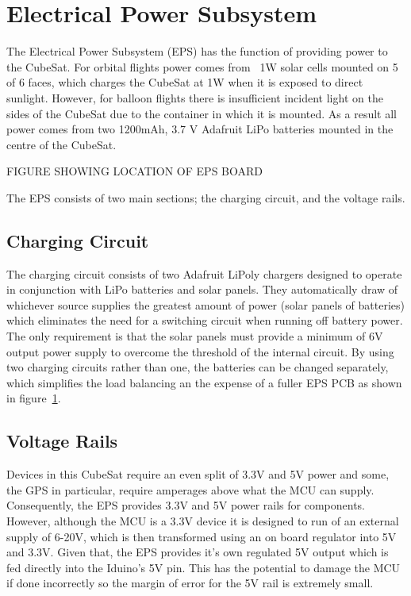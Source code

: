 \section{Electrical Power Subsystem}

The Electrical Power Subsystem (EPS) has the function of providing power to the CubeSat.  For orbital flights power comes from ~1W solar cells mounted on 5 of 6 faces, which charges the CubeSat at 1W when it is exposed to direct sunlight.  However, for balloon flights there is insufficient incident light on the sides of the CubeSat due to the container in which it is mounted.  As a result all power comes from two 1200mAh, 3.7 V Adafruit LiPo batteries mounted in the centre of the CubeSat.

FIGURE SHOWING LOCATION OF EPS BOARD

The EPS consists of two main sections; the charging circuit, and the voltage rails. 

\subsection{Charging Circuit}
The charging circuit consists of two Adafruit LiPoly chargers designed to operate in conjunction with LiPo batteries and solar panels.  They automatically draw of whichever source supplies the greatest amount of power (solar panels of batteries) which eliminates the need for a switching circuit when running off battery power.  The only requirement is that the solar panels must provide a minimum of 6V output power supply to overcome the threshold of the internal circuit.  By using two charging circuits rather than one, the batteries can be changed separately, which simplifies the load balancing an the expense of a fuller EPS PCB as shown in figure~\ref{fig:epspcb}.

\begin{figure}[H]
	\label{fig:epspcb}
\end{figure}

\subsection{Voltage Rails}
Devices in this CubeSat require an even split of 3.3V and 5V power and some, the GPS in particular, require amperages above what the MCU can supply.  Consequently, the EPS provides 3.3V and 5V power rails for components.  However, although the MCU is a 3.3V device it is designed to run of an external supply of 6-20V, which is then transformed using an on board regulator into 5V and 3.3V.  Given that, the EPS provides it's own regulated 5V output which is fed directly into the Iduino's 5V pin.  This has the potential to damage the MCU if done incorrectly so the margin of error for the 5V rail is extremely small.

